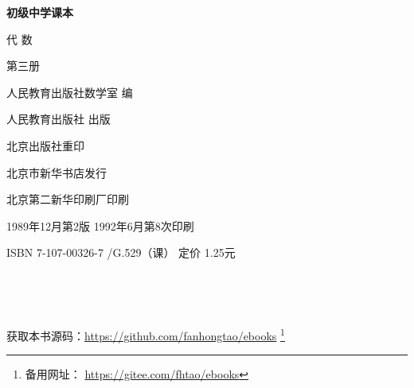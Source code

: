 \begin{titlepage}
    \begin{center}
        \vspace*{3cm}

        {\Large \textbf{初级中学课本} }

        \vspace{1cm}

        {\Huge 代 \qquad 数}

        \vspace{1.5cm}

        {\Large 第三册}

        \vspace{1cm}

        {\Large 人民教育出版社数学室 \quad 编}

        \vfill

        人民教育出版社 出版

        北京出版社重印

        北京市新华书店发行

        北京第二新华印刷厂印刷

        1989年12月第2版  \qquad 1992年6月第8次印刷

        ISBN 7-107-00326-7 /G.529（课） \quad 定价 1.25元

        \,

        \,

        获取本书源码：\url{https://github.com/fanhongtao/ebooks} \footnote{备用网址： \url{https://gitee.com/fhtao/ebooks} }
    \end{center}
 \end{titlepage}
